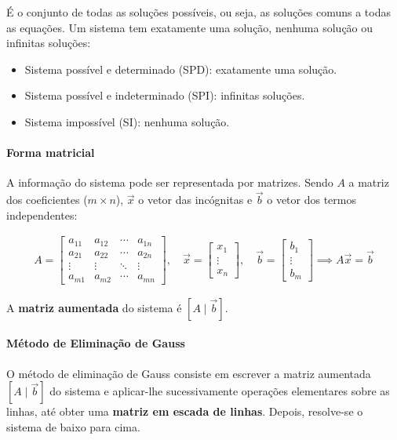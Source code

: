 \documentclass{article}
\begin{document}
É o conjunto de todas as soluções possíveis, ou seja, as soluções comuns a todas as equações.
Um sistema tem exatamente uma solução, nenhuma solução ou infinitas soluções:

\begin{itemize}
    \item Sistema possível e determinado (SPD): exatamente uma solução.
    \item Sistema possível e indeterminado (SPI): infinitas soluções.
    \item Sistema impossível (SI): nenhuma solução.
\end{itemize}

\paragraph{Forma matricial}

A informação do sistema pode ser representada por matrizes. Sendo $A$ a matriz dos coeficientes ($m \times n$),
$\vec{x}$ o vetor das incógnitas e $\vec{b}$ o vetor dos termos independentes:

\begin{gather*}
A =
\begin{bmatrix}
a_{11} & a_{12} & \cdots & a_{1n} \\
a_{21} & a_{22} & \cdots & a_{2n} \\
\vdots & \vdots & \ddots & \vdots \\
a_{m1} & a_{m2} & \cdots & a_{mn}
\end{bmatrix},
\quad
\vec{x} =
\begin{bmatrix}
x_1 \\
\vdots \\
x_n
\end{bmatrix},
\quad
\vec{b} =
\begin{bmatrix}
b_1 \\
\vdots \\
b_m
\end{bmatrix}
\implies
\boxed{A\vec{x} = \vec{b}}
\end{gather*}

A \textbf{matriz aumentada} do sistema é $[A \mid \vec{b}]$.

\paragraph{Método de Eliminação de Gauss}
\label{par: eliminacao-gauss}

O método de eliminação de Gauss consiste em escrever a matriz aumentada $[A \mid \vec{b}]$
do sistema e aplicar-lhe sucessivamente operações elementares sobre as linhas, até obter uma
\textbf{matriz em escada de linhas}. Depois, resolve-se o sistema de baixo para cima.
\end{document}
